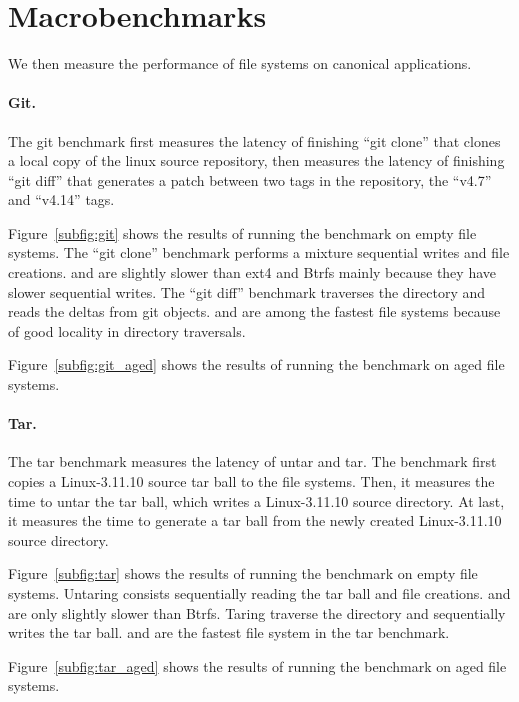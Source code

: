 \section{Macrobenchmarks}
\label{sec:macro}

We then measure the performance of file systems on canonical applications.

\paragraph{Git.}

The git benchmark first measures the latency of finishing ``git clone'' that
clones a local copy of the linux source repository,
then measures the latency of finishing ``git diff'' that generates a patch
between two tags in the repository, the ``v4.7'' and ``v4.14'' tags.

Figure~\ref{subfig:git} shows the results of running the benchmark on empty file
systems.
The ``git clone'' benchmark performs a mixture sequential writes and file
creations.
\betrfsFour and \betrfsFive are slightly slower than ext4 and Btrfs mainly
because they have slower sequential writes.
The ``git diff'' benchmark traverses the directory and reads the deltas from git
objects.
\betrfsFour and \betrfsFive are among the fastest file systems because of good
locality in directory traversals.

Figure~\ref{subfig:git_aged} shows the results of running the benchmark on aged
file systems.

\paragraph{Tar.}

The tar benchmark measures the latency of untar and tar.
The benchmark first copies a Linux-3.11.10 source tar ball to the file systems.
Then, it measures the time to untar the tar ball, which writes a Linux-3.11.10
source directory.
At last, it measures the time to generate a tar ball from the newly created
Linux-3.11.10 source directory.

Figure~\ref{subfig:tar} shows the results of running the benchmark on empty
file systems.
Untaring consists sequentially reading the tar ball and file creations.
\betrfsFour and \betrfsFive are only slightly slower than Btrfs.
Taring traverse the directory and sequentially writes the tar ball.
\betrfsFour and \betrfsFive are the fastest file system in the tar benchmark.

Figure~\ref{subfig:tar_aged} shows the results of running the benchmark on aged
file systems.

